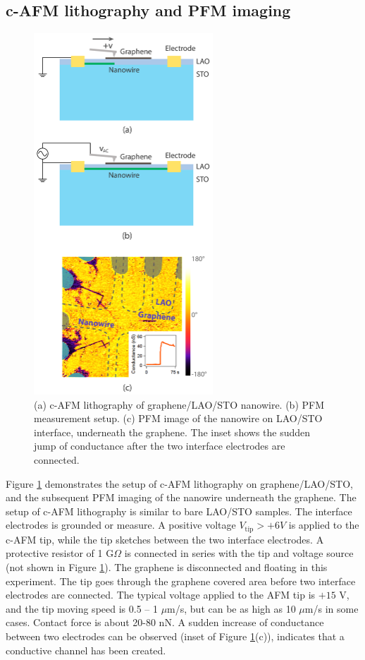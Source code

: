 \documentclass[pdflatex, sectionletters, 12pt]{pittetd}    %
\begin{document}
\subsection{c-AFM lithography and PFM imaging}
\begin{figure}[p]
	\centering
	\includegraphics[width=0.6\textwidth]{Drawing/GraphenePFM.pdf}
	\caption{(a) c-AFM lithography of graphene/LAO/STO nanowire. (b) PFM measurement setup. (c) PFM image of the nanowire on LAO/STO interface, underneath the graphene. The inset shows the sudden jump of conductance after the two interface electrodes are connected.}
	\label{FIG:GraphenePFM}
\end{figure}

Figure \ref{FIG:GraphenePFM} demonstrates the setup of c-AFM lithography on graphene/LAO/STO, and the subsequent PFM imaging of the nanowire underneath the graphene. The setup of c-AFM lithography is similar to bare LAO/STO samples. The interface electrodes is grounded or measure. A positive voltage $V_\mathrm{tip} > +6V$ is applied to the c-AFM tip, while the tip sketches between the two interface electrodes. A protective resistor of 1 G$\Omega$ is connected in series with the tip and voltage source (not shown in Figure \ref{FIG:GraphenePFM}). The graphene is disconnected and floating in this experiment. The tip goes through the graphene covered area before two interface electrodes are connected. The typical voltage applied to the AFM tip is $+15$ V, and the tip moving speed is 0.5 -- 1 $\mu$m/s, but can be as high as 10 $\mu$m/s in some cases. Contact force is about 20-80 nN. A sudden increase of conductance between two electrodes can be observed (inset of Figure \ref{FIG:GraphenePFM}(c)), indicates that a conductive channel has been created. 
\end{document}
